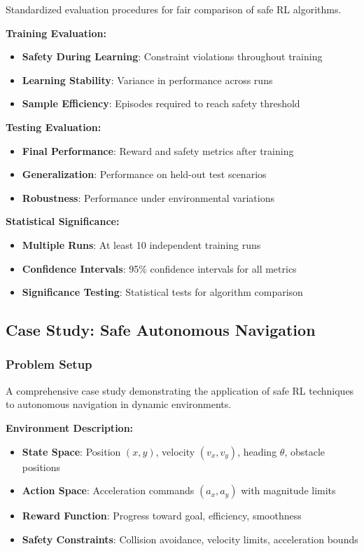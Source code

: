 \documentclass[12pt]{article}
\begin{document}
{{{{Standardized evaluation procedures for fair comparison of safe RL algorithms.

\textbf{Training Evaluation:}
\begin{itemize}
\item \textbf{Safety During Learning}: Constraint violations throughout training
\item \textbf{Learning Stability}: Variance in performance across runs
\item \textbf{Sample Efficiency}: Episodes required to reach safety threshold
\end{itemize}

\textbf{Testing Evaluation:}
\begin{itemize}
\item \textbf{Final Performance}: Reward and safety metrics after training
\item \textbf{Generalization}: Performance on held-out test scenarios
\item \textbf{Robustness}: Performance under environmental variations
\end{itemize}

\textbf{Statistical Significance:}
\begin{itemize}
\item \textbf{Multiple Runs}: At least 10 independent training runs
\item \textbf{Confidence Intervals}: 95\% confidence intervals for all metrics
\item \textbf{Significance Testing}: Statistical tests for algorithm comparison
\end{itemize}

\subsection{Case Study: Safe Autonomous Navigation}

\subsubsection{Problem Setup}

A comprehensive case study demonstrating the application of safe RL techniques to autonomous navigation in dynamic environments.

\textbf{Environment Description:}
\begin{itemize}
\item \textbf{State Space}: Position $(x, y)$, velocity $(v_x, v_y)$, heading $\theta$, obstacle positions
\item \textbf{Action Space}: Acceleration commands $(a_x, a_y)$ with magnitude limits
\item \textbf{Reward Function}: Progress toward goal, efficiency, smoothness
\item \textbf{Safety Constraints}: Collision avoidance, velocity limits, acceleration bounds
\end{itemize}

}}}}
\end{document}
